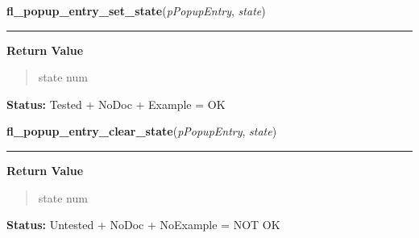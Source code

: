     \label{xformslib:library:fl_popup_entry_set_state}

    \vspace{0.5ex}

\hspace{.8\funcindent}\begin{boxedminipage}{\funcwidth}

    \raggedright \textbf{fl\_popup\_entry\_set\_state}(\textit{pPopupEntry}, \textit{state})

    \vspace{-1.5ex}

    \rule{\textwidth}{0.5\fboxrule}
\setlength{\parskip}{2ex}
\setlength{\parskip}{1ex}
      \textbf{Return Value}
    \vspace{-1ex}

      \begin{quote}
      state num

      \end{quote}

\textbf{Status:} Tested + NoDoc + Example = OK



    \end{boxedminipage}

    \label{xformslib:library:fl_popup_entry_clear_state}

    \vspace{0.5ex}

\hspace{.8\funcindent}\begin{boxedminipage}{\funcwidth}

    \raggedright \textbf{fl\_popup\_entry\_clear\_state}(\textit{pPopupEntry}, \textit{state})

    \vspace{-1.5ex}

    \rule{\textwidth}{0.5\fboxrule}
\setlength{\parskip}{2ex}
\setlength{\parskip}{1ex}
      \textbf{Return Value}
    \vspace{-1ex}

      \begin{quote}
      state num

      \end{quote}

\textbf{Status:} Untested + NoDoc + NoExample = NOT OK



    \end{boxedminipage}

